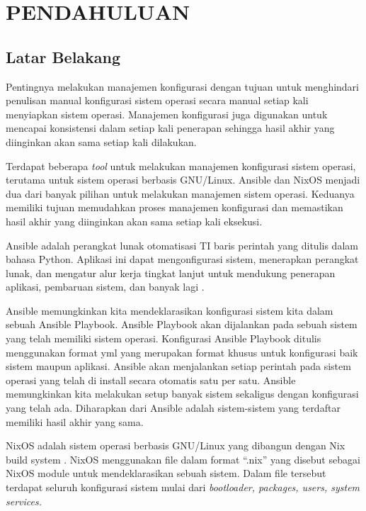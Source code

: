 \documentclass[10pt,]{report}
\begin{document}
\chapter{PENDAHULUAN}
\section{Latar Belakang}
\begin{adjustwidth}{0.70cm}{}
	\vspace{-3mm}
	\hspace\parindent
	Pentingnya melakukan manajemen konfigurasi dengan tujuan untuk menghindari
	penulisan manual konfigurasi sistem operasi secara manual setiap kali
	menyiapkan sistem operasi. Manajemen konfigurasi juga digunakan untuk
	mencapai konsistensi dalam setiap kali penerapan sehingga hasil akhir yang
	diinginkan akan sama setiap kali dilakukan.

	Terdapat beberapa \textit{tool} untuk melakukan manajemen konfigurasi sistem operasi,
	terutama untuk sistem operasi berbasis GNU/Linux. Ansible dan NixOS menjadi
	dua dari banyak pilihan untuk melakukan manajemen sistem operasi. Keduanya
	memiliki tujuan memudahkan proses manajemen konfigurasi dan memastikan hasil
	akhir yang diinginkan akan sama setiap kali eksekusi.

	Ansible adalah perangkat lunak otomatisasi TI baris perintah yang ditulis
	dalam bahasa Python. Aplikasi ini dapat mengonfigurasi sistem, menerapkan
	perangkat lunak, dan mengatur alur kerja tingkat lanjut untuk mendukung
	penerapan aplikasi, pembaruan sistem, dan banyak lagi \parencite{AnsibleRedHat}.

	Ansible memungkinkan kita mendeklarasikan konfigurasi sistem kita dalam
	sebuah Ansible Playbook. Ansible Playbook akan dijalankan pada sebuah sistem
	yang telah memiliki sistem operasi. Konfigurasi Ansible Playbook ditulis
	menggunakan format yml yang merupakan format khusus untuk konfigurasi baik
	sistem maupun aplikasi. Ansible akan menjalankan setiap perintah pada sistem
	operasi yang telah di install secara otomatis satu per satu. Ansible
	memungkinkan kita melakukan setup banyak sistem sekaligus dengan konfigurasi
	yang telah ada. Diharapkan dari Ansible adalah sistem-sistem yang terdaftar
	memiliki hasil akhir yang sama.

	NixOS adalah sistem operasi berbasis GNU/Linux yang dibangun dengan Nix build
	system \parencite{hownixworks} . NixOS menggunakan file dalam format “.nix” yang disebut sebagai NixOS
	module untuk mendeklarasikan sebuah sistem. Dalam file tersebut terdapat
	seluruh konfigurasi sistem mulai dari \textit{bootloader, packages, users, system services.}


\end{adjustwidth}
\end{document}
